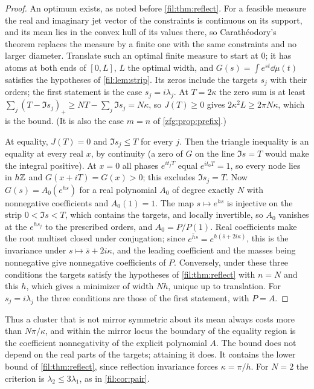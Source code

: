\begin{proof}
An optimum exists, as noted before \cref{fil:thm:reflect}. For a feasible measure the real and imaginary jet
vector of the constraints is continuous on its support, and its mean lies in the convex hull of its values
there, so Carath\'eodory's theorem replaces the measure by a finite one with the same constraints and no larger
diameter. Translate such an optimal finite measure to start at $0$; it has atoms at both ends of $[0,L]$,
$L$ the optimal width, and $G(s)=\int e^{st}\dd\mu(t)$ satisfies the hypotheses of \cref{fil:lem:strip}. Its zeros
include the targets $s_j$ with their orders; the first statement is the case $s_j=i\lambda_j$. At $T=2\kappa$ the
zero sum is at least $\sum_j(T-\Im s_j)_+\ge NT-\sum_j\Im s_j=N\kappa$, so $J(T)\ge0$ gives $2\kappa^2L\ge2\pi N\kappa$,
which is the bound. (It is also the case $m=n$ of \cref{zfg:prop:prefix}.)

At equality, $J(T)=0$ and $\Im s_j\le T$ for every $j$. Then the triangle inequality is an equality at every
real $x$, by continuity (a zero of $G$ on the line $\Im s=T$ would make the integral positive). At $x=0$ all
phases $e^{it_jT}$ equal $e^{it_0T}=1$, so every node lies in $h\mathbb{Z}$ and $G(x+iT)=G(x)>0$; this excludes
$\Im s_j=T$. Now $G(s)=A_0(e^{hs})$ for a real polynomial $A_0$ of degree exactly $N$ with nonnegative
coefficients and $A_0(1)=1$. The map $s\mapsto e^{hs}$ is injective on the strip $0<\Im s<T$, which contains the
targets, and locally invertible, so $A_0$ vanishes at the $e^{hs_j}$ to the prescribed orders, and $A_0=P/P(1)$.
Real coefficients make the root multiset closed under conjugation; since $\overline{e^{hs}}=e^{h(\bar s+2i\kappa)}$,
this is the invariance under $s\mapsto\bar s+2i\kappa$, and the leading coefficient and the masses being
nonnegative give nonnegative coefficients of $P$. Conversely, under these three conditions the targets satisfy
the hypotheses of \cref{fil:thm:reflect} with $n=N$ and this $h$, which gives a minimizer of width $Nh$, unique
up to translation. For $s_j=i\lambda_j$ the three conditions are those of the first statement, with $P=A$.
\end{proof}

Thus a cluster that is not mirror symmetric about its mean always costs more than $N\pi/\kappa$, and within the
mirror locus the boundary of the equality region is the coefficient nonnegativity of the explicit polynomial
$A$. The bound does not depend on the real parts of the targets; attaining it does. It contains the lower
bound of \cref{fil:thm:reflect}, since reflection invariance forces $\kappa=\pi/h$. For $N=2$ the criterion is
$\lambda_2\le3\lambda_1$, as in \cref{fil:cor:pair}.

